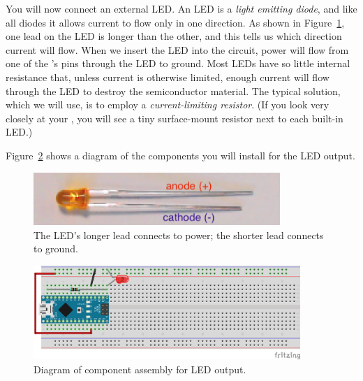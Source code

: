You will now connect an external LED. An LED is a \textit{light emitting diode}, and like all diodes it allows current to flow only in one direction.
As shown in Figure~\ref{fig:led-annotated}, one lead on the LED is longer than the other, and this tells us which direction current will flow.
When we insert the LED into the circuit, power will flow from one of the \developmentboard's pins through the LED to ground.
Most LEDs have so little internal resistance that, unless current is otherwise limited, enough current will flow through the LED to destroy the semiconductor material.
The typical solution, which we will use, is to employ a \textit{current-limiting resistor}.
(If you look very closely at your \developmentboard, you will see a tiny surface-mount resistor next to each built-in LED.)

Figure~\ref{fig:led-diagram} shows a diagram of the components you will install for the LED output.

\begin{figure}
    \centering
    \includegraphics[height=2cm]{direct/led/led-annotated}
    \caption{The LED's longer lead connects to power; the shorter lead connects to ground.\label{fig:led-annotated}}
\end{figure}

\begin{figure}
    \centering
    \includegraphics[width=0.9\textwidth]{fritzing_diagrams/led}
    \caption{Diagram of component assembly for LED output. \label{fig:led-diagram}}
\end{figure}

